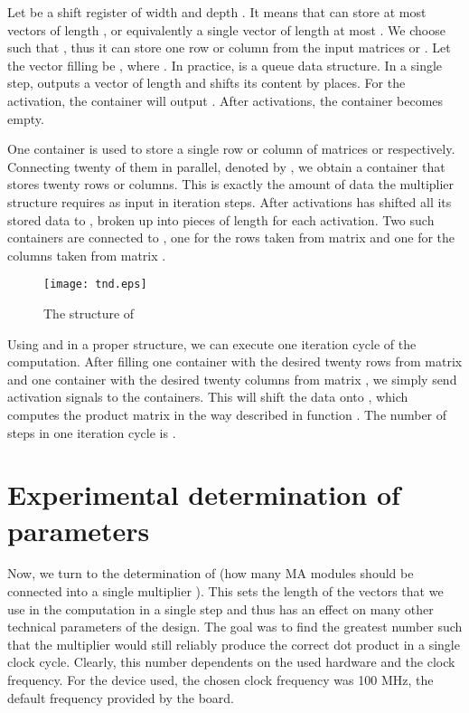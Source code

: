 \documentclass[11pt,twoside]{article}
\begin{document}
Let  be a shift register of width  and depth . It means that  can store at most  vectors of length , or equivalently a single vector of length at most . We choose  such that , thus it can store one row or column from the input matrices  or . Let the vector filling  be , where . In practice,  is a queue data structure. In a single step,  outputs a vector of length  and shifts its content by  places. For the  activation, the container will output .  After  activations, the container becomes empty.

One container  is used to store a single row or column of matrices  or  respectively. Connecting twenty of them in parallel, denoted by , we obtain a container that stores twenty rows or column\-s. This is exactly the amount of data the  multiplier structure requires as input in  iteration steps. After  activations  has shifted all its stored data to , broken up into pieces of length  for each activation. Two such  containers are connected to , one for the rows taken from matrix  and one for the columns taken from matrix .

\begin{figure}[h!]
\centering
\texttt{[image: tnd.eps]}
\caption{The structure of }
\end{figure}

Using  and  in a proper structure, we can execute one iteration cycle of the computation. After filling one  container with the desired twenty rows from matrix  and one  container with the desired twenty columns from matrix , we simply send  activation signals to the containers. This will shift the data onto , which computes the  product matrix in the way described in function . The number of steps in one iteration cycle is .

\section{Experimental determination of parameters}

Now, we turn to the determination of  (how many MA modules should be connected into a single multiplier ). This sets the length of the vectors that we use in the computation in a single step and thus has an effect on many other technical parameters of the design. The goal was to find the greatest number such that the multiplier would still reliably produce the correct dot product in a single clock cycle. Clearly, this number dependents on the used hardware and the clock frequency. For the device used, the chosen clock frequency was 100 MHz, the default frequency provided by the board.
\end{document}
